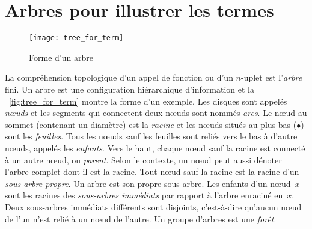 \section{Arbres pour illustrer les termes}
\label{def:tree}

%
\begin{wrapfigure}[9]{r}[0pt]{0pt}
\centering
\texttt{[image: tree\_for\_term]}%
\caption{Forme d'un arbre}
\label{fig:tree_for_term}
\end{wrapfigure}
La compréhension topologique d'un appel de fonction ou d'un
\(n\)-uplet est l'\emph{arbre} fini. Un arbre est une
configuration hiérarchique d'information et la
\fig~\vref{fig:tree_for_term}
montre la forme d'un exemple. Les disques sont appelés
\emph{nœuds} et les segments qui connectent
deux nœuds sont nommés \emph{arcs}. Le nœud
au sommet (contenant un diamètre) est la
\emph{racine} et les nœuds situés au
plus bas (\(\bullet\)) sont les
\emph{feuilles}. Tous les nœuds sauf
les feuilles sont reliés vers le bas à d'autre nœuds, appelés les
\emph{enfants}. Vers le haut, chaque
nœud sauf la racine est connecté à un autre nœud, ou
\emph{parent}. Selon le contexte, un
nœud peut aussi dénoter l'arbre complet dont il est la
racine. Tout nœud sauf la racine est la racine d'un
\emph{sous-arbre propre}. Un
arbre est son propre sous-arbre. Les enfants d'un nœud~\(x\) sont
les racines des \emph{sous-arbres
  immédiats} par rapport à
l'arbre enraciné en~\(x\). Deux sous-arbres immédiats différents sont
disjoints, c'est-à-dire qu'aucun nœud de l'un n'est relié à un
nœud de l'autre. Un groupe d'arbres est une
\emph{forêt}.

